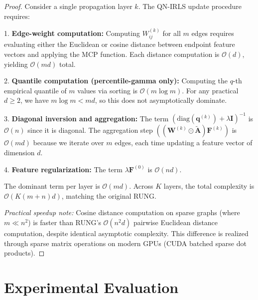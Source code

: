 \documentclass[sigconf]{acmart}
\begin{document}
\begin{proof}
Consider a single propagation layer $k$. The QN-IRLS update procedure~\cite{hou2024rung} requires:

1. \textbf{Edge-weight computation:} Computing $W^{(k)}_{ij}$ for all $m$ edges requires evaluating either the Euclidean or cosine distance between endpoint feature vectors and applying the MCP function. Each distance computation is $\mathcal{O}(d)$, yielding $\mathcal{O}(md)$ total.

2. \textbf{Quantile computation (percentile-gamma only):} Computing the $q$-th empirical quantile of $m$ values via sorting is $\mathcal{O}(m \log m)$. For any practical $d \geq 2$, we have $m \log m < md$, so this does not asymptotically dominate.

3. \textbf{Diagonal inversion and aggregation:} The term $(\mathrm{diag}(\mathbf{q}^{(k)}) + \lambda\mathbf{I})^{-1}$ is $\mathcal{O}(n)$ since it is diagonal. The aggregation step $((\mathbf{W}^{(k)} \odot \tilde{\mathbf{A}})\mathbf{F}^{(k)})$ is $\mathcal{O}(md)$ because we iterate over $m$ edges, each time updating a feature vector of dimension $d$.

4. \textbf{Feature regularization:} The term $\lambda\mathbf{F}^{(0)}$ is $\mathcal{O}(nd)$.

The dominant term per layer is $\mathcal{O}(md)$. Across $K$ layers, the total complexity is $\mathcal{O}(K(m+n)d)$, matching the original RUNG.

\textit{Practical speedup note:} Cosine distance computation on sparse graphs (where $m \ll n^2$) is faster than RUNG's $\mathcal{O}(n^2 d)$ pairwise Euclidean distance computation, despite identical asymptotic complexity. This difference is realized through sparse matrix operations on modern GPUs (CUDA batched sparse dot products).
\end{proof}

\section{Experimental Evaluation}
\end{document}
